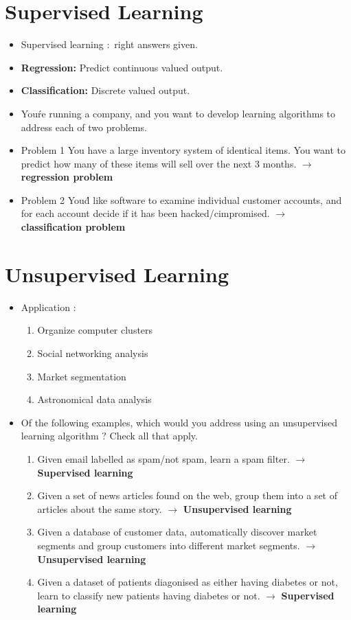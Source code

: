 \documentclass[13pt]{book}
\begin{document}
\section{Supervised Learning}
\begin{itemize}
  \item Supervised learning \(:\) right answers given.
  \item \textbf{Regression:} Predict continuous valued output.
  \item \textbf{Classification:} Discrete valued output.
  \item You\'re running a company, and you want to develop learning algorithms to address each of two problems.
  \item Problem 1 You have a large inventory system of identical items. You want to predict how many of these items will sell over the next 3 months. \(\rightarrow\) \textbf{regression problem}
  \item Problem 2 You\'d like software to examine individual customer accounts, and for each account decide if it has been hacked/cimpromised. \(\rightarrow\) \textbf{classification problem}
\end{itemize}

\section{Unsupervised Learning}
\begin{itemize}
\item Application \(:\)
  \begin{enumerate}
    \item Organize computer clusters
    \item Social networking analysis
    \item Market segmentation
    \item Astronomical data analysis
  \end{enumerate}
\item Of the following examples, which would you address using an unsupervised learning algorithm \(?\) Check all that apply.
  \begin{enumerate}
    \item Given email labelled as spam/not spam, learn a spam filter. \(\rightarrow\) \textbf{Supervised learning}
    \item Given a set of news articles found on the web, group them into a set of articles about the same story. \(\rightarrow\) \textbf{Unsupervised learning}
    \item Given a database of customer data, automatically discover market segments and group customers into different market segments. \(\rightarrow\) \textbf{Unsupervised learning}
    \item Given a dataset of patients diagonised as either having diabetes or not, learn to classify new patients having diabetes or not. \(\rightarrow\) \textbf{Supervised learning}
  \end{enumerate}
  
\end{itemize}
\end{document}
